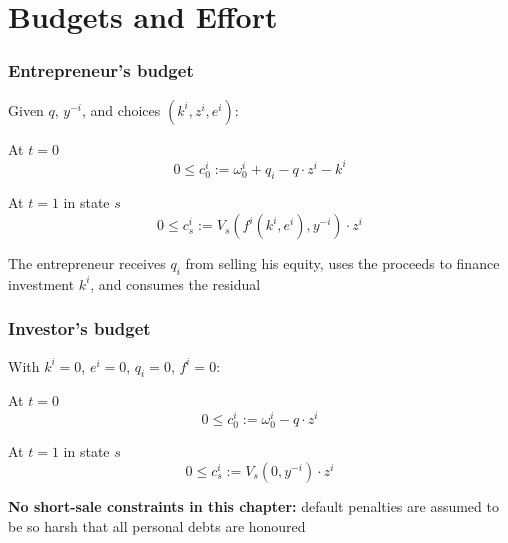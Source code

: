 \documentclass[blue]{beamer}
\def\leq{\leqslant}
\theoremstyle{definition}
\theoremstyle{example}
\begin{document}
\section{Budgets and Effort}

\begin{frame}\frametitle{Entrepreneur's budget}
Given $q$, $y^{-i}$, and choices $(k^i, z^i, e^i)$:
\bigskip

\begin{block}{At $t = 0$}
\begin{equation*}
0 \leq c^i_0 := \omega^i_0 + q_i - q \cdot z^i - k^i
\end{equation*}
\end{block}

\begin{block}{At $t = 1$ in state $s$}
\begin{equation*}
0 \leq c^i_s := V_s(f^i(k^i, e^i), y^{-i}) \cdot z^i
\end{equation*}
\end{block}
\bigskip

The entrepreneur receives $q_i$ from selling his equity, uses the proceeds to finance investment $k^i$, and consumes the residual
\end{frame}

\begin{frame}\frametitle{Investor's budget}
With $k^i = 0$, $e^i = 0$, $q_i = 0$, $f^i = 0$:
\bigskip

\begin{block}{At $t = 0$}
\begin{equation*}
0 \leq c^i_0 := \omega^i_0 - q \cdot z^i
\end{equation*}
\end{block}

\begin{block}{At $t = 1$ in state $s$}
\begin{equation*}
0 \leq c^i_s := V_s(0, y^{-i}) \cdot z^i
\end{equation*}
\end{block}
\bigskip

\textbf{No short-sale constraints in this chapter:} default penalties are assumed to be so harsh that all personal debts are honoured
\end{frame}
\end{document}
